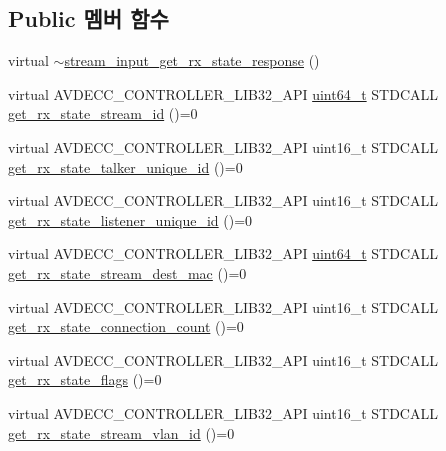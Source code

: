 \subsection*{Public 멤버 함수}
\begin{DoxyCompactItemize}
\item 
virtual \hyperlink{classavdecc__lib_1_1stream__input__get__rx__state__response_af2380b0659d68206d5f7da9be0c68890}{$\sim$stream\+\_\+input\+\_\+get\+\_\+rx\+\_\+state\+\_\+response} ()
\item 
virtual A\+V\+D\+E\+C\+C\+\_\+\+C\+O\+N\+T\+R\+O\+L\+L\+E\+R\+\_\+\+L\+I\+B32\+\_\+\+A\+PI \hyperlink{parse_8c_aec6fcb673ff035718c238c8c9d544c47}{uint64\+\_\+t} S\+T\+D\+C\+A\+LL \hyperlink{classavdecc__lib_1_1stream__input__get__rx__state__response_aa778838fbcebe5544f9914a8e58a4d59}{get\+\_\+rx\+\_\+state\+\_\+stream\+\_\+id} ()=0
\item 
virtual A\+V\+D\+E\+C\+C\+\_\+\+C\+O\+N\+T\+R\+O\+L\+L\+E\+R\+\_\+\+L\+I\+B32\+\_\+\+A\+PI uint16\+\_\+t S\+T\+D\+C\+A\+LL \hyperlink{classavdecc__lib_1_1stream__input__get__rx__state__response_a2a94051c37a5a75ff635fe9f386cd2d3}{get\+\_\+rx\+\_\+state\+\_\+talker\+\_\+unique\+\_\+id} ()=0
\item 
virtual A\+V\+D\+E\+C\+C\+\_\+\+C\+O\+N\+T\+R\+O\+L\+L\+E\+R\+\_\+\+L\+I\+B32\+\_\+\+A\+PI uint16\+\_\+t S\+T\+D\+C\+A\+LL \hyperlink{classavdecc__lib_1_1stream__input__get__rx__state__response_aa0bccb0d6ad0b1cdad76ad48da795e11}{get\+\_\+rx\+\_\+state\+\_\+listener\+\_\+unique\+\_\+id} ()=0
\item 
virtual A\+V\+D\+E\+C\+C\+\_\+\+C\+O\+N\+T\+R\+O\+L\+L\+E\+R\+\_\+\+L\+I\+B32\+\_\+\+A\+PI \hyperlink{parse_8c_aec6fcb673ff035718c238c8c9d544c47}{uint64\+\_\+t} S\+T\+D\+C\+A\+LL \hyperlink{classavdecc__lib_1_1stream__input__get__rx__state__response_af3fbe91d396cd14ae6a62da61e451997}{get\+\_\+rx\+\_\+state\+\_\+stream\+\_\+dest\+\_\+mac} ()=0
\item 
virtual A\+V\+D\+E\+C\+C\+\_\+\+C\+O\+N\+T\+R\+O\+L\+L\+E\+R\+\_\+\+L\+I\+B32\+\_\+\+A\+PI uint16\+\_\+t S\+T\+D\+C\+A\+LL \hyperlink{classavdecc__lib_1_1stream__input__get__rx__state__response_a053075d490d7b1261fe95fbe8127fdd0}{get\+\_\+rx\+\_\+state\+\_\+connection\+\_\+count} ()=0
\item 
virtual A\+V\+D\+E\+C\+C\+\_\+\+C\+O\+N\+T\+R\+O\+L\+L\+E\+R\+\_\+\+L\+I\+B32\+\_\+\+A\+PI uint16\+\_\+t S\+T\+D\+C\+A\+LL \hyperlink{classavdecc__lib_1_1stream__input__get__rx__state__response_a5f976cc82f976b016498516710bc7912}{get\+\_\+rx\+\_\+state\+\_\+flags} ()=0
\item 
virtual A\+V\+D\+E\+C\+C\+\_\+\+C\+O\+N\+T\+R\+O\+L\+L\+E\+R\+\_\+\+L\+I\+B32\+\_\+\+A\+PI uint16\+\_\+t S\+T\+D\+C\+A\+LL \hyperlink{classavdecc__lib_1_1stream__input__get__rx__state__response_afc54cf313418c5eba8fb03a55165b6b2}{get\+\_\+rx\+\_\+state\+\_\+stream\+\_\+vlan\+\_\+id} ()=0
\end{DoxyCompactItemize}


